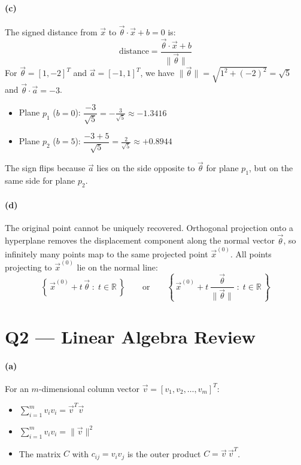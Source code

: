 \documentclass[11pt]{article}
\newcommand{\R}{\mathbb{R}}
\begin{document}
\paragraph{(c)} The signed distance from $\vec{x}$ to $\vec{\theta}\cdot\vec{x}+b=0$ is:
\[ \text{distance} = \frac{\vec{\theta}\cdot\vec{x}+b}{\|\vec{\theta}\|} \]
For $\vec\theta=[1,-2]^T$ and $\vec a=[-1,1]^T$, we have $\|\vec\theta\|=\sqrt{1^2+(-2)^2}=\sqrt{5}$ and $\vec\theta\cdot\vec a = -3$.
\begin{itemize}\itemsep2pt
\item[(i)] Plane $p_1$ ($b=0$): \quad $\dfrac{-3}{\sqrt5} = \boxed{-\tfrac{3}{\sqrt5}\approx-1.3416}$
\item[(ii)] Plane $p_2$ ($b=5$): \quad $\dfrac{-3+5}{\sqrt5} = \boxed{\tfrac{2}{\sqrt5}\approx+0.8944}$
\end{itemize}
The sign flips because $\vec a$ lies on the side opposite to $\vec\theta$ for plane $p_1$, but on the same side for plane $p_2$.

\paragraph{(d)} The original point cannot be uniquely recovered. Orthogonal projection onto a hyperplane removes the displacement component along the normal vector $\vec{\theta}$, so infinitely many points map to the same projected point $\vec{x}^{(0)}$.
All points projecting to $\vec{x}^{(0)}$ lie on the normal line:
\[ \left\{\, \vec{x}^{(0)} + t\,\vec{\theta} \;:\; t\in\R \,\right\} \qquad\text{or}\qquad \left\{\, \vec{x}^{(0)} + t\,\frac{\vec{\theta}}{\|\vec{\theta}\|} \;:\; t\in\R \,\right\} \]

\section*{Q2 --- Linear Algebra Review}

\paragraph{(a)} For an $m$-dimensional column vector $\vec{v}=[v_1, v_2, \dots, v_m]^T$:
\begin{itemize}\itemsep2pt
\item[i.] $\displaystyle\sum_{i=1}^m v_i v_i = \vec{v}^T\vec{v}$
\item[ii.] $\displaystyle\sum_{i=1}^m v_i v_i = \|\vec{v}\|^2$
\item[iii.] The matrix $C$ with $c_{ij} = v_i v_j$ is the outer product $C = \vec{v}\,\vec{v}^T$.
\end{itemize}
\end{document}
